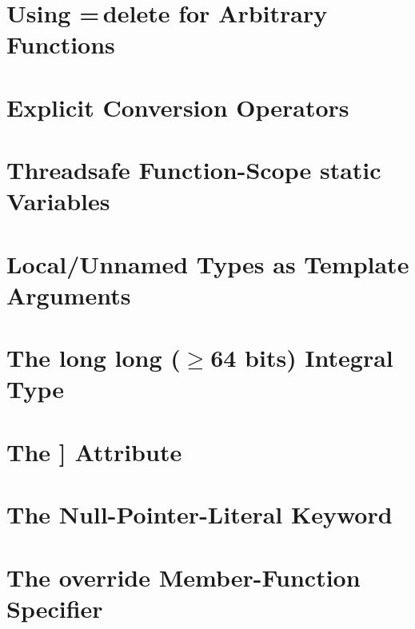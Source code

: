 \newpage
\section[Deleted Functions]{Using {\SecCode =}\,{\SecCode delete} for Arbitrary Functions}\label{deleted-functions}


\newpage
\section[{\tt explicit} Operators]{Explicit Conversion Operators}\label{explicit-conversion-operators}


\newpage
\section[Function {\tt static} '11]{Threadsafe Function-Scope {\SecCode static} Variables}\label{thread-safe-function-static-variables}
 

\newpage
\section[Local Types '11]{Local/Unnamed Types as Template Arguments}\label{local-types-as-template-arguments}


\newpage
\section[{\tt long} {\tt long}]{The {\SecCode long} {\SecCode long} ({\large $\boldsymbol{\geq}$}64 bits) Integral Type}\label{long-long}


\newpage
\section[{\tt noreturn}]{The {\SecCode [[noreturn]]} Attribute}\label{the-noreturn-attribute}


\newpage
\section[{\tt nullptr}]{The Null-Pointer-Literal Keyword}\label{null-pointer-literal-(nullptr)}



\newpage
\section[{\tt override}]{The {\SecCode override} Member-Function Specifier}\label{override}


